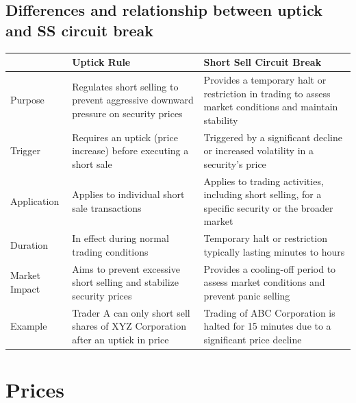 \documentclass[11pt]{article}
\begin{document}
\subsection{Differences and relationship between uptick and SS circuit break}
\label{sec:org46dd944}

\begin{center}
\begin{tabular}{lll}
\hline
 & Uptick Rule & Short Sell Circuit Break\\[0pt]
\hline
Purpose & Regulates short selling to prevent aggressive downward pressure on security prices & Provides a temporary halt or restriction in trading to assess market conditions and maintain stability\\[0pt]
Trigger & Requires an uptick (price increase) before executing a short sale & Triggered by a significant decline or increased volatility in a security's price\\[0pt]
Application & Applies to individual short sale transactions & Applies to trading activities, including short selling, for a specific security or the broader market\\[0pt]
Duration & In effect during normal trading conditions & Temporary halt or restriction typically lasting minutes to hours\\[0pt]
Market Impact & Aims to prevent excessive short selling and stabilize security prices & Provides a cooling-off period to assess market conditions and prevent panic selling\\[0pt]
Example & Trader A can only short sell shares of XYZ Corporation after an uptick in price & Trading of ABC Corporation is halted for 15 minutes due to a significant price decline\\[0pt]
\hline
\end{tabular}
\end{center}


\section{Prices}
\label{sec:org86dd0b1}
\end{document}
